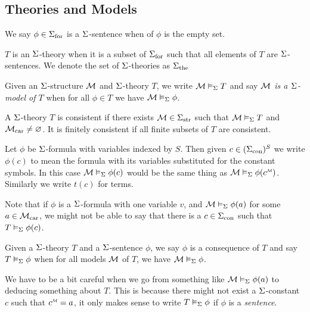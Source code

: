 \subsection{Theories and Models}
\begin{dfn}
    We say $\phi \in {\Sigma}_\mathrm{for}$ is a $\Sigma$-sentence when 
    of $\phi$ is the empty set.
    
    $T$ is an $\Sigma$-theory when it is a subset of ${\Sigma}_\mathrm{for}$
    such that all elements of $T$ are $\Sigma$-sentences.
    We denote the set of $\Sigma$-theories as ${\Sigma}_\mathrm{the}$
\end{dfn}

\begin{dfn} 
    Given an $\Sigma$-structure $\mathcal{M}$ and $\Sigma$-theory $T$, 
    we write $\mathcal{M} \vDash_{\Sigma} T$ and say
    \emph{$\mathcal{M}$ is a $\Sigma$-model of $T$} when 
    for all $\phi \in T$ we have $\mathcal{M} \vDash_{\Sigma} \phi$.
    
    A $\Sigma$-theory $T$ is consistent if there exists 
    $\mathcal{M} \in {\Sigma}_\mathrm{str}$ such that $\mathcal{M} \vDash_{\Sigma} T$ and 
    ${\mathcal{M}}_\mathrm{car} \ne \varnothing$. 
    It is finitely consistent if all 
    finite subsets of $T$ are consistent.

    Let $\phi$ be $\Sigma$-formula with variables indexed by $S$. 
    Then given $c \in ({\Sigma}_\mathrm{con})^S$ we write 
    $\phi(c)$ to mean the formula with its 
    variables substituted for the constant symbols.
    In this case $\mathcal{M} \vDash_{\Sigma} \phi(c)$ would be the same thing as 
    $\MM \model{\Si} \phi(\mmintp{c})$.
    Similarly we write $t(c)$ for terms.
\end{dfn}
Note that if $\phi$ is a $\Sigma$-formula with one variable $v$,
and $\mathcal{M} \vDash_{\Sigma} \phi(a)$ for some $a \in {\mathcal{M}}_\mathrm{car}$, 
we might not be able to say that there is a 
$c \in {\Sigma}_\mathrm{con}$ such that $T \vDash_{\Sigma} \phi(c)$.

\begin{dfn}[Consequence]
    Given a $\Sigma$-theory $T$ 
    and a $\Sigma$-sentence $\phi$,
    we say $\phi$ is a consequence of $T$
    and say $T \vDash_{\Sigma} \phi$ 
    when for all models $\mathcal{M}$ of $T$, 
    we have $\mathcal{M} \vDash_{\Sigma} \phi$.
\end{dfn}
\begin{rmk}
    We have to be a bit careful when we go from something like
    $\mathcal{M} \vDash_{\Sigma} \phi(a)$ to deducing something about $T$.
    This is because there might not exist a $\Sigma$-constant $c$ 
    such that $\modintp{\MM}{c} = a$,
    it only makes sense to write $T \vDash_{\Sigma} \phi$ if $\phi$
    is a \emph{sentence}.
\end{rmk}


